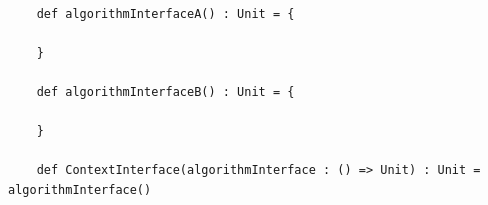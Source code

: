 \begin{lstlisting}[caption={Strategy Orientação a Objetos},label=oostrategy]
    
    def algorithmInterfaceA() : Unit = {
        
    }

    def algorithmInterfaceB() : Unit = {
        
    }

    def ContextInterface(algorithmInterface : () => Unit) : Unit = algorithmInterface()

\end{lstlisting}